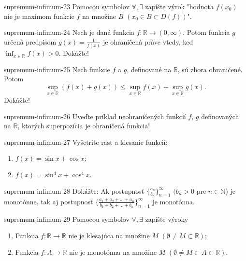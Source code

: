 \begin{defproblem}{supremum-infimum-23}
Pomocou symbolov $\forall,\exists$ zapíšte výrok "hodnota $f(x_0)$ nie je maximom funkcie $f$ na množine $B$ $(x_0\in B\subset D(f))$".
\end{defproblem}

\begin{defproblem}{supremum-infimum-24}
Nech je daná funkcia $f:\mathbb{R}\rightarrow(0,\infty)$. Potom funkcia $g$ určená predpisom $g(x)=\frac{1}{f(x)}$ je ohraničená práve vtedy, keď $\inf_{x\in\mathbb{R}}f(x)>0$. Dokážte!
\end{defproblem}

\begin{defproblem}{supremum-infimum-25}
Nech funkcie $f$ a $g$, definované na $\mathbb{R}$, sú zhora ohraničené. Potom $$\sup_{x\in\mathbb{R}}(f(x)+g(x))\leq\sup_{x\in\mathbb{R}}f(x)+\sup_{x\in\mathbb{R}}g(x).$$ Dokážte!
\end{defproblem}

\begin{defproblem}{supremum-infimum-26}
Uveďte príklad neohraničených funkcií $f$, $g$ definovaných na $\mathbb{R}$, ktorých superpozícia je ohraničená funkcia!
\end{defproblem}

\begin{defproblem}{supremum-infimum-27}
Vyšetrite rast a klesanie funkcií:
\begin{enumerate}
\item $f(x)=\sin x +\cos x$;
\item $f(x)=\sin^4 x +\cos^4 x$.
\end{enumerate}
\end{defproblem}

\begin{defproblem}{supremum-infimum-28}
Dokážte: Ak postupnosť $\{\frac{a_n}{b_n}\}_{n=1}^\infty$ $(b_n>0$ pre $n\in\mathbb{N}$) je monotónne, tak aj postupnosť $\{\frac{a_1+a_2+...+a_n}{b_1+b_2+...+b_n}\}_{n=1}^\infty$ je monotónna.
\end{defproblem}

\begin{defproblem}{supremum-infimum-29}
Pomocou symbolov $\forall,\exists$ zapíšte výroky
\begin{enumerate}
\item Funkcia $f:\mathbb{R}\rightarrow\mathbb{R}$ nie je klesajúca na množine $M$ $(\emptyset \neq M\subset\mathbb{R})$;
\item Funkcia $f:A \rightarrow\mathbb{R}$ nie je monotónna na množine $M$ $(\emptyset \neq M\subset A \subset\mathbb{R})$.
\end{enumerate}
\end{defproblem}

